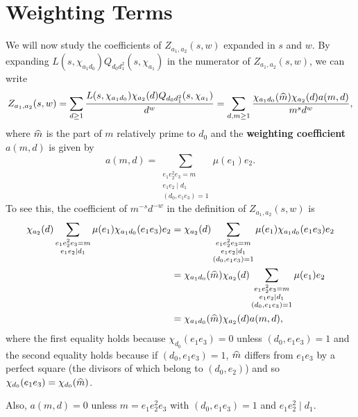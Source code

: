 \documentclass[12pt,reqno,oneside]{amsart}
\begin{document}
\section*{Weighting Terms}
    We will now study the coefficients of $Z_{a_{1},a_{2}}(s,w)$ expanded in $s$ and $w$. By expanding $L(s,\chi_{a_{1}d_{0}})Q_{d_{0}d_{1}^{2}}(s,\chi_{a_{1}})$ in the numerator of $Z_{a_{1},a_{2}}(s,w)$, we can write
    \[
        Z_{a_{1},a_{2}}(s,w) = \sum_{d \ge 1}\frac{L(s,\chi_{a_{1}d_{0}})\chi_{a_{2}}(d)Q_{d_{0}d_{1}^{2}}(s,\chi_{a_{1}})}{d^{w}} = \sum_{d,m \ge 1}\frac{\chi_{a_{1}d_{0}}(\widehat{m})\chi_{a_{2}}(d)a(m,d)}{m^{s}d^{w}},
    \]
    where $\widehat{m}$ is the part of $m$ relatively prime to $d_{0}$ and the \textbf{weighting coefficient} $a(m,d)$ is given by
    \[
        a(m,d) = \sum_{\substack{e_{1}e_{2}^{2}e_{3} = m \\ e_{1}e_{2} \mid d_{1} \\ (d_{0},e_{1}e_{3}) = 1}}\mu(e_{1})e_{2}.
    \]
    To see this, the coefficient of $m^{-s}d^{-w}$ in the definition of $Z_{a_{1},a_{2}}(s,w)$ is
    \begin{align*}
        \chi_{a_{2}}(d)\sum_{\substack{e_{1}e_{2}^{2}e_{3} = m \\ e_{1}e_{2} \mid d_{1}}}\mu(e_{1})\chi_{a_{1}d_{0}}(e_{1}e_{3})e_{2} &= \chi_{a_{2}}(d)\sum_{\substack{e_{1}e_{2}^{2}e_{3} = m \\ e_{1}e_{2} \mid d_{1} \\ (d_{0},e_{1}e_{3}) = 1}}\mu(e_{1})\chi_{a_{1}d_{0}}(e_{1}e_{3})e_{2} \\
        &= \chi_{a_{1}d_{0}}(\widehat{m})\chi_{a_{2}}(d)\sum_{\substack{e_{1}e_{2}^{2}e_{3} = m \\ e_{1}e_{2} \mid d_{1} \\ (d_{0},e_{1}e_{3}) = 1}}\mu(e_{1})e_{2} \\
        &= \chi_{a_{1}d_{0}}(\widehat{m})\chi_{a_{2}}(d)a(m,d),
    \end{align*}
    where the first equality holds because $\chi_{d_{0}}(e_{1}e_{3}) = 0$ unless $(d_{0},e_{1}e_{3}) = 1$ and the second equality holds because if $(d_{0},e_{1}e_{3}) = 1$, $\widehat{m}$ differs from $e_{1}e_{3}$ by a perfect square (the divisors of which belong to $(d_{0},e_{2})$) and so $\chi_{d_{0}}(e_{1}e_{3}) = \chi_{d_{0}}(\widehat{m})$. 
    
    \begin{remark}\label{rem:weighting_coefficient_remark}
        Also, $a(m,d) = 0$ unless $m = e_{1}e_{2}^{2}e_{3}$ with $(d_{0},e_{1}e_{3}) = 1$ and $e_{1}e_{2}^{2} \mid d_{1}$.
    \end{remark}
\end{document}
